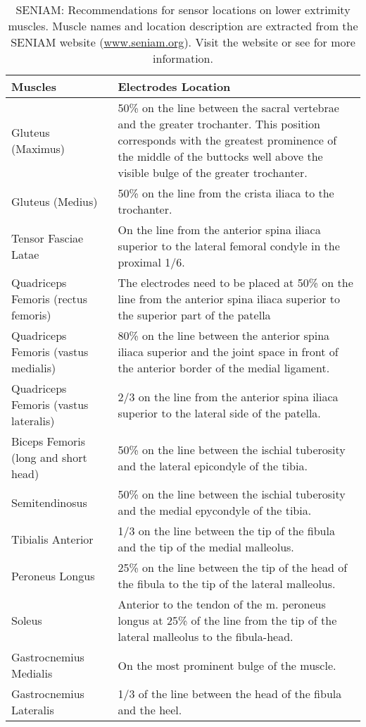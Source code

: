 \begin{table}[ht!]
    \centering
    \caption{\ac{SENIAM}: Recommendations for sensor locations on lower extrimity muscles. Muscle names and location description are extracted from the \ac{SENIAM} website (\href{www.seniam.org}{www.seniam.org}). Visit the website or see \cite{Hermens1999} for more information.}
    \label{tab:SENIAM-mus-and-loc}
    \small
    \begin{tabular}{>{\raggedright}p{4.2cm}|p{8cm}}
        Muscles & Electrodes Location \\ \hline
        Gluteus (Maximus) & 50\% on the line between the sacral vertebrae and the greater trochanter. This position corresponds with the greatest prominence of the middle of the buttocks well above the visible bulge of the greater trochanter. \\
        Gluteus (Medius) & 50\% on the line from the crista iliaca to the trochanter.\\
        Tensor Fasciae Latae & On the line from the anterior spina iliaca superior to the lateral femoral condyle in the proximal 1/6.\\
        Quadriceps Femoris (rectus femoris) & The electrodes need to be placed at 50\% on the line from the anterior spina iliaca superior to the superior part of the patella\\
        Quadriceps Femoris (vastus medialis) & 80\% on the line between the anterior spina iliaca superior and the joint space in front of the anterior border of the medial ligament.\\
        Quadriceps Femoris (vastus lateralis) & 2/3 on the line from the anterior spina iliaca superior to the lateral side of the patella.\\
        Biceps Femoris (long and short head) & 50\% on the line between the ischial tuberosity and the lateral epicondyle of the tibia.\\
        Semitendinosus & 50\% on the line between the ischial tuberosity and the medial epycondyle of the tibia.\\
        Tibialis Anterior & 1/3 on the line between the tip of the fibula and the tip of the medial malleolus.\\
        Peroneus Longus & 25\% on the line between the tip of the head of the fibula to the tip of the lateral malleolus.\\
        Soleus & Anterior to the tendon of the m. peroneus longus at 25\% of the line from the tip of the lateral malleolus to the fibula-head.\\
        Gastrocnemius Medialis & On the most prominent bulge of the muscle.\\
        Gastrocnemius Lateralis & 1/3 of the line between the head of the fibula and the heel.
    \end{tabular}
\end{table}